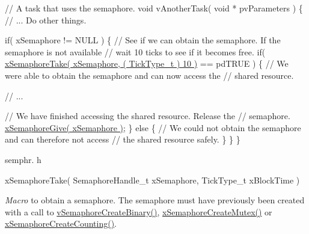 \begin{DoxyPre}// A task that uses the semaphore.
void vAnotherTask( void * pvParameters )
\{
 // ... Do other things.\end{DoxyPre}



\begin{DoxyPre} if( xSemaphore != NULL )
 \{
     // See if we can obtain the semaphore.  If the semaphore is not available
     // wait 10 ticks to see if it becomes free.
     if( \hyperlink{vendor_2ceedling_2plugins_2freertos_2src_2freertos_2include_2semphr_8h_af116e436d2a5ae5bd72dbade2b5ea930}{xSemaphoreTake( xSemaphore, ( TickType\_t ) 10 )} == pdTRUE )
     \{
         // We were able to obtain the semaphore and can now access the
         // shared resource.\end{DoxyPre}



\begin{DoxyPre}         // ...\end{DoxyPre}



\begin{DoxyPre}         // We have finished accessing the shared resource.  Release the
         // semaphore.
         \hyperlink{vendor_2ceedling_2plugins_2freertos_2src_2freertos_2include_2semphr_8h_aae55761cabfa9bf85c8f4430f78c0953}{xSemaphoreGive( xSemaphore )};
     \}
     else
     \{
         // We could not obtain the semaphore and can therefore not access
         // the shared resource safely.
     \}
 \}
\}
\end{DoxyPre}


semphr. h 
\begin{DoxyPre}xSemaphoreTake(
                    SemaphoreHandle\_t xSemaphore,
                    TickType\_t xBlockTime
                )\end{DoxyPre}


{\itshape Macro} to obtain a semaphore. The semaphore must have previously been created with a call to \hyperlink{vendor_2ceedling_2plugins_2freertos_2src_2freertos_2include_2semphr_8h_ae10bffadd26fbd5bcce76bf33a83ef30}{v\+Semaphore\+Create\+Binary()}, \hyperlink{vendor_2ceedling_2plugins_2freertos_2src_2freertos_2include_2semphr_8h_aa6a00aa9b91a9e5b3ebe4ae1c3f115c6}{x\+Semaphore\+Create\+Mutex()} or \hyperlink{vendor_2ceedling_2plugins_2freertos_2src_2freertos_2include_2semphr_8h_a7764616a918a46115403569a88148ad4}{x\+Semaphore\+Create\+Counting()}.


